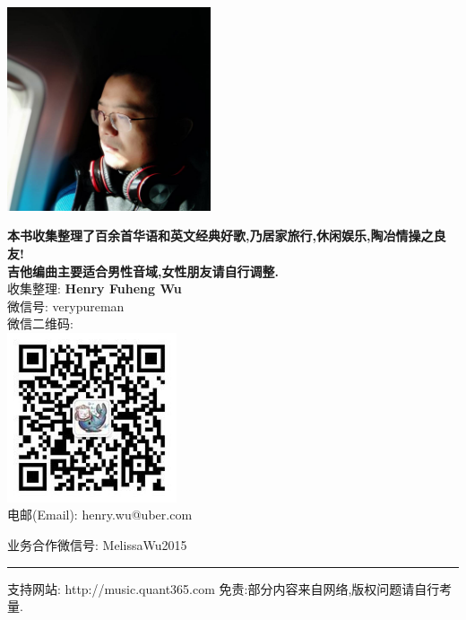 
\begin{center}
\vspace{10mm}
\includegraphics[width=60mm]{img/me.png}\\
\vspace{5mm}
\vspace*{1\baselineskip}

\textbf{本书收集整理了百余首华语和英文经典好歌,乃居家旅行,休闲娱乐,陶冶情操之良友!}\\
\textbf{吉他编曲主要适合男性音域,女性朋友请自行调整.}\\



收集整理: \textbf{Henry Fuheng Wu} \\
微信号: verypureman \\
微信二维码:\\
\includegraphics[width=50mm]{img/wechat.jpg}\\
电邮(Email): henry.wu@uber.com


\vspace{5mm}

业务合作微信号: MelissaWu2015

\end{center}

\vfill
\noindent\rule{6cm}{0.4pt}

支持网站: http://music.quant365.com 免责:部分内容来自网络,版权问题请自行考量. \\
\pagebreak
